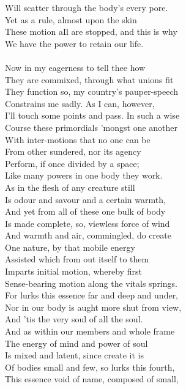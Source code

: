 Will scatter through the body's every pore.\\
Yet as a rule, almost upon the skin\\
These motion aIl are stopped, and this is why\\
We have the power to retain our life.\\
\\
Now in my eagerness to tell thee how\\
They are commixed, through what unions fit\\
They function so, my country's pauper-speech\\
Constrains me sadly. As I can, however,\\
I'll touch some points and pass. In such a wise\\
Course these primordials 'mongst one another\\
With inter-motions that no one can be\\
From other sundered, nor its agency\\
Perform, if once divided by a space;\\
Like many powers in one body they work.\\
As in the flesh of any creature still\\
Is odour and savour and a certain warmth,\\
And yet from all of these one bulk of body\\
Is made complete, so, viewless force of wind\\
And warmth and air, commingled, do create\\
One nature, by that mobile energy\\
Assisted which from out itself to them\\
Imparts initial motion, whereby first\\
Sense-bearing motion along the vitals springs.\\
For lurks this essence far and deep and under,\\
Nor in our body is aught more shut from view,\\
And 'tis the very soul of all the soul.\\
And as within our members and whole frame\\
The energy of mind and power of soul\\
Is mixed and latent, since create it is\\
Of bodies small and few, so lurks this fourth,\\
This essence void of name, composed of small,\\
